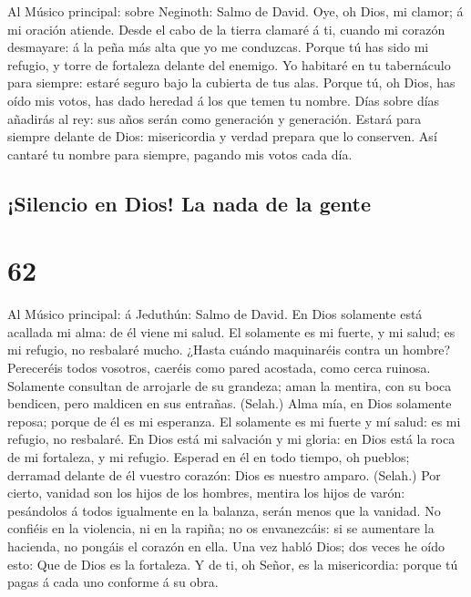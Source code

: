  Al Músico principal: sobre Neginoth: Salmo de David. Oye,
oh Dios, mi clamor; á mi oración atiende.  Desde el cabo
de la tierra clamaré á ti, cuando mi corazón desmayare: á la peña más
alta que yo me conduzcas.  Porque tú has sido mi refugio,
y torre de fortaleza delante del enemigo.  Yo habitaré en
tu tabernáculo para siempre: estaré seguro bajo la cubierta de tus alas.
 Porque tú, oh Dios, has oído mis votos, has dado heredad
á los que temen tu nombre.  Días sobre días añadirás al
rey: sus años serán como generación y generación.  Estará
para siempre delante de Dios: misericordia y verdad prepara que lo
conserven.  Así cantaré tu nombre para siempre, pagando
mis votos cada día.

\hypertarget{silencio-en-dios-la-nada-de-la-gente}{%
\subsection{¡Silencio en Dios! La nada de la
gente}\label{silencio-en-dios-la-nada-de-la-gente}}

\hypertarget{section-61}{%
\section{62}\label{section-61}}

 Al Músico principal: á Jeduthún: Salmo de David. En Dios
solamente está acallada mi alma: de él viene mi salud.  El
solamente es mi fuerte, y mi salud; es mi refugio, no resbalaré mucho.
 ¿Hasta cuándo maquinaréis contra un hombre? Pereceréis
todos vosotros, caeréis como pared acostada, como cerca ruinosa.
 Solamente consultan de arrojarle de su grandeza; aman la
mentira, con su boca bendicen, pero maldicen en sus entrañas. (Selah.)
 Alma mía, en Dios solamente reposa; porque de él es mi
esperanza.  El solamente es mi fuerte y mí salud: es mi
refugio, no resbalaré.  En Dios está mi salvación y mi
gloria: en Dios está la roca de mi fortaleza, y mi refugio.
 Esperad en él en todo tiempo, oh pueblos; derramad
delante de él vuestro corazón: Dios es nuestro amparo. (Selah.)
 Por cierto, vanidad son los hijos de los hombres, mentira
los hijos de varón: pesándolos á todos igualmente en la balanza, serán
menos que la vanidad.  No confiéis en la violencia, ni en
la rapiña; no os envanezcáis: si se aumentare la hacienda, no pongáis el
corazón en ella.  Una vez habló Dios; dos veces he oído
esto: Que de Dios es la fortaleza.  Y de ti, oh Señor, es
la misericordia: porque tú pagas á cada uno conforme á su obra.

